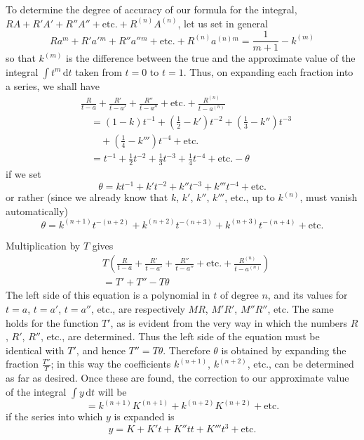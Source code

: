 To determine the degree of accuracy of our formula for the integral, $RA+R'A'+R''A''+\text{etc.}+R^{(n)}A^{(n)}$, let us set in general
\[
Ra^m+R'a'{}^m+R''a''{}^m+\text{etc.}+R^{(n)}a^{(n)m}=\frac{1}{m+1}-k^{(m)}
\]
so that $k^{(m)}$ is the difference between the true and the approximate value of the integral $\int t^m\,\mathrm{d}t$ taken from $t=0$ to $t=1$. Thus, on expanding each fraction into a series, we shall have
\[
\begin{aligned}
&\frac{R}{t-a}+\frac{R'}{t-a'}+\frac{R''}{t-a''}+\text{etc.}+\frac{R^{(n)}}{t-a^{(n)}}\\
&\quad=(1-k)t^{-1}+(\tfrac12-k')t^{-2}+(\tfrac13-k'')t^{-3}\\ &\qquad+(\tfrac14-k''')t^{-4}+\text{etc.}\\
&\quad=t^{-1}+\tfrac12t^{-2}+\tfrac13t^{-3}+\tfrac14t^{-4}+\text{etc.}-\theta
\end{aligned}
\]
if we set
\[
\theta=kt^{-1}+k't^{-2}+k''t^{-3}+k'''t^{-4}+\text{etc.}
\]
or rather (since we already know that $k$, $k'$, $k''$, $k'''$, etc., up to $k^{(n)}$, must vanish automatically)
\[
\theta=k^{(n+1)}t^{-(n+2)}+k^{(n+2)}t^{-(n+3)}+k^{(n+3)}t^{-(n+4)}+\text{etc.}
\]

Multiplication by $T$ gives
\[
\begin{aligned}&T\left(\frac{R}{t-a}+\frac{R'}{t-a'}+\frac{R''}{t-a''}+\text{etc.}+\frac{R^{(n)}}{t-a^{(n)}}\right)\\ &=T'+T''-T\theta\end{aligned}
\]
The left side of this equation is a polynomial in $t$ of degree $n$, and its values for $t=a$, $t=a'$, $t=a''$, etc., are respectively $MR$, $M'R'$, $M''R''$, etc. The same holds for the function $T'$, as is evident from the very way in which the numbers $R$, $R'$, $R''$, etc., are determined. Thus the left side of the equation must be identical with $T'$, and hence $T''=T\theta$. Therefore $\theta$ is obtained by expanding the fraction $\frac{T''}{T}$; in this way the coefficients $k^{(n+1)}$, $k^{(n+2)}$, etc., can be determined as far as desired. Once these are found, the correction to our approximate value of the integral $\int y\,\mathrm{d}t$ will be
\[
=k^{(n+1)}K^{(n+1)}+k^{(n+2)}K^{(n+2)}+\text{etc.}
\]
if the series into which $y$ is expanded is
\[
y=K+K't+K''tt+K'''t^3+\text{etc.}
\]

